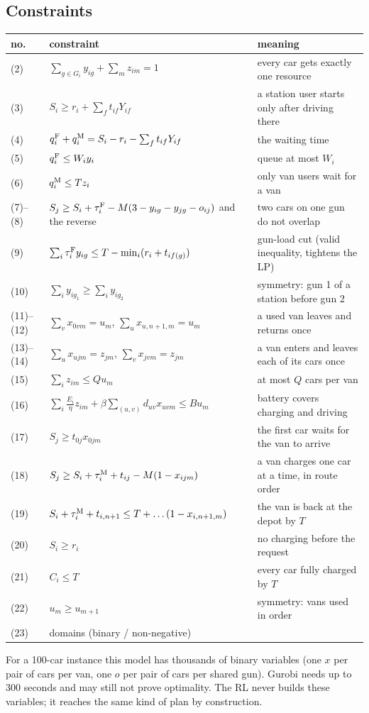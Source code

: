 \subsection{Constraints}
{\small
\begin{longtable}{@{}l>{\raggedright\arraybackslash}p{7.3cm}>{\raggedright\arraybackslash}p{6.3cm}@{}}
\toprule
no. & constraint & meaning \\
\midrule
\endhead
(2) & $\sum_{g\in G_i}y_{ig}+\sum_m z_{im}=1$ & every car gets exactly one resource \\
(3) & $S_i\ge r_i+\sum_f t_{if}Y_{if}$ & a station user starts only after driving there \\
(4) & $q^{\mathrm{F}}_i+q^{\mathrm{M}}_i=S_i-r_i-\sum_f t_{if}Y_{if}$ & the waiting time \\
(5) & $q^{\mathrm{F}}_i\le W_iy_i$ & queue at most $W_i$ \\
(6) & $q^{\mathrm{M}}_i\le Tz_i$ & only van users wait for a van \\
(7)--(8) & $S_j\ge S_i+\tau^{\mathrm{F}}_i-M(3-y_{ig}-y_{jg}-o_{ij})$ and the reverse & two cars on one gun do not overlap \\
(9) & $\sum_i\tau^{\mathrm{F}}_iy_{ig}\le T-\min_i(r_i+t_{if(g)})$ & gun-load cut (valid inequality, tightens the LP) \\
(10) & $\sum_iy_{ig_1}\ge\sum_iy_{ig_2}$ & symmetry: gun 1 of a station before gun 2 \\
(11)--(12) & $\sum_v x_{0vm}=u_m$, $\sum_u x_{u,n+1,m}=u_m$ & a used van leaves and returns once \\
(13)--(14) & $\sum_u x_{ujm}=z_{jm}$, $\sum_v x_{jvm}=z_{jm}$ & a van enters and leaves each of its cars once \\
(15) & $\sum_iz_{im}\le Qu_m$ & at most $Q$ cars per van \\
(16) & $\sum_i\frac{E_i}{\eta}z_{im}+\beta\sum_{(u,v)}d_{uv}x_{uvm}\le Bu_m$ & battery covers charging and driving \\
(17) & $S_j\ge t_{0j}x_{0jm}$ & the first car waits for the van to arrive \\
(18) & $S_j\ge S_i+\tau^{\mathrm{M}}_i+t_{ij}-M(1-x_{ijm})$ & a van charges one car at a time, in route order \\
(19) & $S_i+\tau^{\mathrm{M}}_i+t_{i,n+1}\le T+\dots(1-x_{i,n+1,m})$ & the van is back at the depot by $T$ \\
(20) & $S_i\ge r_i$ & no charging before the request \\
(21) & $C_i\le T$ & every car fully charged by $T$ \\
(22) & $u_m\ge u_{m+1}$ & symmetry: vans used in order \\
(23) & domains (binary / non-negative) & \\
\bottomrule
\end{longtable}}

For a 100-car instance this model has thousands of binary variables (one $x$ per pair of cars per van, one $o$ per pair of cars per shared gun). Gurobi needs up to 300 seconds and may still not prove optimality. The RL never builds these variables; it reaches the same kind of plan by construction.

